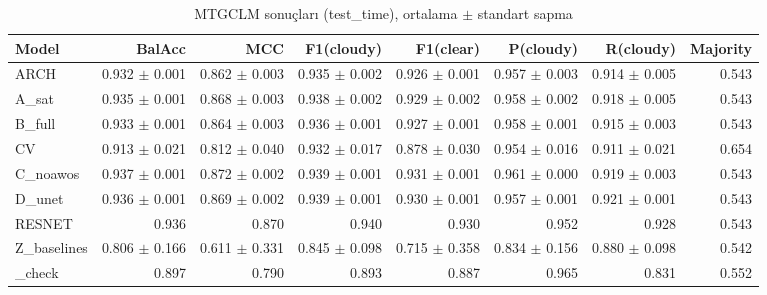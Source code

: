 \begin{table}[ht]
\centering
\caption{MTGCLM sonuçları (test_time), ortalama $\pm$ standart sapma}
\label{tab:results_test_time}
\begin{tabular}{lrrrrrrr}
\hline
Model & BalAcc & MCC & F1(cloudy) & F1(clear) & P(cloudy) & R(cloudy) & Majority \\
\hline
ARCH & 0.932 $\pm$ 0.001 & 0.862 $\pm$ 0.003 & 0.935 $\pm$ 0.002 & 0.926 $\pm$ 0.001 & 0.957 $\pm$ 0.003 & 0.914 $\pm$ 0.005 & 0.543 \\
A\_sat & 0.935 $\pm$ 0.001 & 0.868 $\pm$ 0.003 & 0.938 $\pm$ 0.002 & 0.929 $\pm$ 0.002 & 0.958 $\pm$ 0.002 & 0.918 $\pm$ 0.005 & 0.543 \\
B\_full & 0.933 $\pm$ 0.001 & 0.864 $\pm$ 0.003 & 0.936 $\pm$ 0.001 & 0.927 $\pm$ 0.001 & 0.958 $\pm$ 0.001 & 0.915 $\pm$ 0.003 & 0.543 \\
CV & 0.913 $\pm$ 0.021 & 0.812 $\pm$ 0.040 & 0.932 $\pm$ 0.017 & 0.878 $\pm$ 0.030 & 0.954 $\pm$ 0.016 & 0.911 $\pm$ 0.021 & 0.654 \\
C\_noawos & 0.937 $\pm$ 0.001 & 0.872 $\pm$ 0.002 & 0.939 $\pm$ 0.001 & 0.931 $\pm$ 0.001 & 0.961 $\pm$ 0.000 & 0.919 $\pm$ 0.003 & 0.543 \\
D\_unet & 0.936 $\pm$ 0.001 & 0.869 $\pm$ 0.002 & 0.939 $\pm$ 0.001 & 0.930 $\pm$ 0.001 & 0.957 $\pm$ 0.001 & 0.921 $\pm$ 0.001 & 0.543 \\
RESNET & 0.936 & 0.870 & 0.940 & 0.930 & 0.952 & 0.928 & 0.543 \\
Z\_baselines & 0.806 $\pm$ 0.166 & 0.611 $\pm$ 0.331 & 0.845 $\pm$ 0.098 & 0.715 $\pm$ 0.358 & 0.834 $\pm$ 0.156 & 0.880 $\pm$ 0.098 & 0.542 \\
\_check & 0.897 & 0.790 & 0.893 & 0.887 & 0.965 & 0.831 & 0.552 \\
\hline
\end{tabular}
\end{table}

